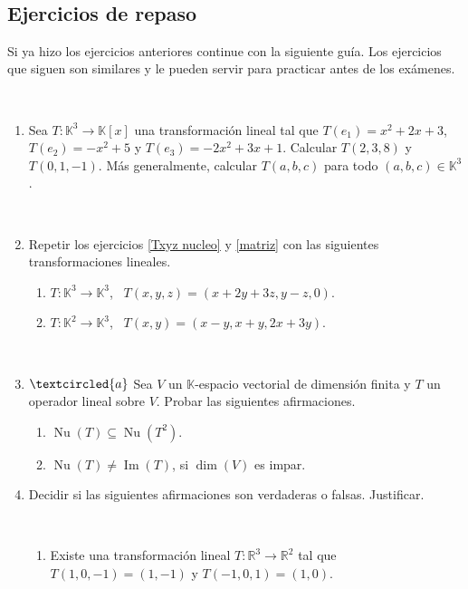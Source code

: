 \documentclass[12pt]{amsart}
\begin{document}
\

\subsection*{Ejercicios de repaso}
Si ya hizo los ejercicios anteriores continue con la siguiente gu\'ia. Los ejercicios que siguen son similares y le pueden servir para practicar antes de los ex\'amenes.

\

\begin{enumerate}[resume, topsep=5pt,itemsep=5pt]
\item Sea $T: \mathbb{K}^3\longrightarrow\mathbb{K}[x]$ una transformaci\'on lineal tal que $T(e_1)=x^2+2x+3$, \linebreak $T(e_2)=-x^2+5$ y $T(e_3)=-2x^2+3x+1$. Calcular $T(2,3,8)$ y $T(0,1,-1)$. M\'as generalmente, calcular $T(a,b,c)$ para todo $(a,b,c)\in\mathbb{K}^3$.

\      

\item Repetir los ejercicios \eqref{Txyz nucleo} y \eqref{matriz} con las siguientes transformaciones lineales.
\begin{enumerate}[topsep=5pt,itemsep=5pt]
 \item $T:\mathbb{K}^3\longrightarrow\mathbb{K}^3$, \ $T(x,y,z)=(x+2y+3z, y-z,0)$.
 \item $T:\mathbb{K}^2 \longrightarrow \mathbb{K}^3$, \ $T(x,y)=(x-y,x+y,2x+3y)$.
\end{enumerate}	

\

\item $\textcircled{a}$ Sea $V$ un $\mathbb{K}$-espacio vectorial de dimensi\'on finita y $T$ un operador lineal sobre $V$. Probar las siguientes afirmaciones.
    \begin{enumerate}[topsep=5pt,itemsep=5pt]
    \item $\operatorname{Nu}(T)\subseteq\operatorname{Nu}(T^2)$.
    \item\label{dimV impar} $\operatorname{Nu}(T)\neq\operatorname{Im}(T)$, si $\dim(V)$ es impar.
    \end{enumerate}

\newpage

\item Decidir si las siguientes afirmaciones son verdaderas o falsas. Justificar.

\

\begin{enumerate}
\item Existe una transformaci\' on lineal $T : \mathbb R^3 \to \mathbb R^2$ tal que $T(1, 0,-1) = (1, -1)$ y $T(-1, 0, 1) = (1, 0)$.


\end{enumerate}
\end{enumerate}
\end{document}
